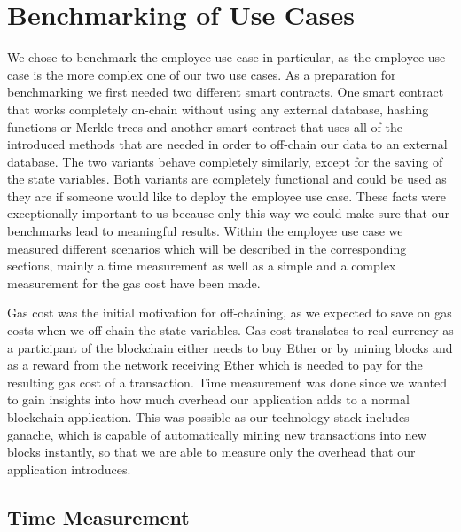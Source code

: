 \section{Benchmarking of Use Cases}

We chose to benchmark the employee use case in particular, as the employee use case is the more complex one of our two use cases.
As a preparation for benchmarking we first needed two different smart contracts.
One smart contract that works completely on-chain without using any external database, hashing functions or Merkle trees and another smart contract that uses all of the introduced methods that are needed in order to off-chain our data to an external database.
The two variants behave completely similarly, except for the saving of the state variables.
Both variants are completely functional and could be used as they are if someone would like to deploy the employee use case.
These facts were exceptionally important to us because only this way we could make sure that our benchmarks lead to meaningful results.
Within the employee use case we measured different scenarios which will be described in the corresponding sections, mainly a time measurement as well as a simple and a complex measurement for the gas cost have been made.

Gas cost was the initial motivation for off-chaining, as we expected to save on gas costs when we off-chain the state variables.
Gas cost translates to real currency as a participant of the blockchain either needs to buy Ether or by mining blocks and as a reward from the network receiving Ether which is needed to pay for the resulting gas cost of a transaction.
Time measurement was done since we wanted to gain insights into how much overhead our application adds to a normal blockchain application.
This was possible as our technology stack includes ganache, which is capable of automatically mining new transactions into new blocks instantly, so that we are able to measure only the overhead that our application introduces.

\subsection{Time Measurement}

